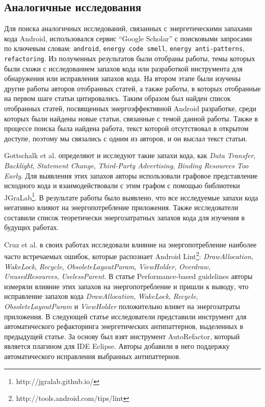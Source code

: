 \label{sec:relatedworks}


\subsection{Аналогичные исследования}


Для поиска аналогичных исследований, связанных с энергетическими запахами кода Android, использовался сервис “Google Scholar” с поисковыми запросами по ключевым словам: \texttt{android}, \texttt{energy code smell}, \texttt{energy anti-patterns}, \texttt{refactoring}. Из полученных результатов были отобраны работы, темы которых были схожи с исследованием запахов кода или разработкой инструмента для обнаружения или исправления запахов кода. На втором этапе были изучены другие работы авторов отобранных статей, а также работы, в которых отобранные на первом шаге статьи цитировались. Таким образом был найден список отобранных статей, посвященных энергоэффективной Android разработке, среди которых были найдены новые статьи, связанные с темой данной работы. Также в процессе поиска была найдена работа, текст которой отсутствовал в открытом доступе, поэтому мы связались с одним из авторов, и он выслал текст статьи.

Gottschalk et al. \cite{gottschalk2016refactorings} определяют и исследуют такие запахи кода, как \emph{Data Transfer}, \emph{Backlight}, \emph{Statement Change}, \emph{Third-Party Advertising}, \emph{Binding Resources Too Early}. Для выявления этих запахов авторы использовали графовое представление исходного кода и взаимодействовали с этим графом с помощью библиотеки JGraLab\footnote{http://jgralab.github.io/}. В результате работы было выявлено, что все исследуемые запахи кода негативно влияют на энергопотребление приложения. Также исследователи составили список теоретически энергозатратных запахов кода для изучения в будущих работах.

Cruz et al. в своих работах исследовали влияние на энергопотребление наиболее часто встречаемых ошибок, которые распознает Android Lint\footnote{http://tools.android.com/tips/lint}: \emph{DrawAllocation}, \emph{WakeLock}, \emph{Recycle}, \emph{ObsoleteLayoutParam}, \emph{ViewHolder}, \emph{Overdraw}, \emph{UnusedResources}, \emph{UselessParent}.
В статье Performance-based guidelines \cite{cruz2017performance} авторы измеряли влияние этих запахов на энергопотребление и пришли к выводу, что исправление запахов кода \emph{DrawAllocation}, \emph{WakeLock}, \emph{Recycle}, \emph{ObsoleteLayoutParam} и \emph{ViewHolder} положительно влияет на энергозатраты приложения. 
В следующей статье \cite{cruz2018using} исследователи представили инструмент для автоматического рефакторинга энергетических антипаттернов, выделенных в предыдущей статье. За основу был взят инструмент AutoRefactor, который является плагином для IDE Eclipse. Авторы добавили в него поддержку автоматического исправления выбранных антипаттернов. 

